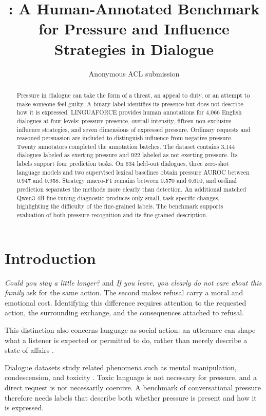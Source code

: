 \documentclass[11pt]{article}
\title{\LNGF{}: A Human-Annotated Benchmark\\for Pressure and Influence Strategies in Dialogue}
\author{Anonymous ACL submission}
\newcommand{\LNGF}{LINGUAFORCE}
\begin{document}
\maketitle

\begin{abstract}
Pressure in dialogue can take the form of a threat, an appeal to duty, or an
attempt to make someone feel guilty. A binary label identifies its presence
but does not describe how it is expressed. \LNGF{} provides human annotations
for 4,066 English dialogues at four levels: pressure presence, overall
intensity, fifteen non-exclusive influence strategies, and seven dimensions
of expressed pressure. Ordinary requests and reasoned persuasion are included
to distinguish influence from negative pressure. Twenty annotators completed
the annotation batches. The dataset contains 3,144 dialogues labeled as
exerting pressure and 922 labeled as not exerting pressure. Its labels
support four prediction tasks. On 634 held-out dialogues, three zero-shot
language models and two supervised lexical baselines obtain pressure AUROC
between 0.947 and 0.958. Strategy macro-F1 remains between 0.570 and 0.610,
and ordinal prediction separates the methods more clearly than detection.
An additional matched Qwen3-4B fine-tuning diagnostic produces only small,
task-specific changes, highlighting the difficulty of the fine-grained labels.
The benchmark supports evaluation of both pressure recognition and its
fine-grained description.
\end{abstract}

\section{Introduction}
\emph{Could you stay a little longer?} and \emph{If you leave, you clearly do
not care about this family} ask for the same action. The second makes refusal
carry a moral and emotional cost. Identifying this difference requires
attention to the requested action, the surrounding exchange, and the
consequences attached to refusal.

This distinction also concerns language as social action: an utterance can
shape what a listener is expected or permitted to do, rather than merely
describe a state of affairs \citep{ahearn2001}.

Dialogue datasets study related phenomena such as mental manipulation,
condescension, and toxicity \citep{mentalmanip,multimanip,talkdown2023,toxicchat2023}.
Toxic language is not necessary for pressure, and a direct request is not
necessarily coercive. A benchmark of conversational pressure therefore
needs labels that describe both whether pressure is present and how it is
expressed.
\end{document}
